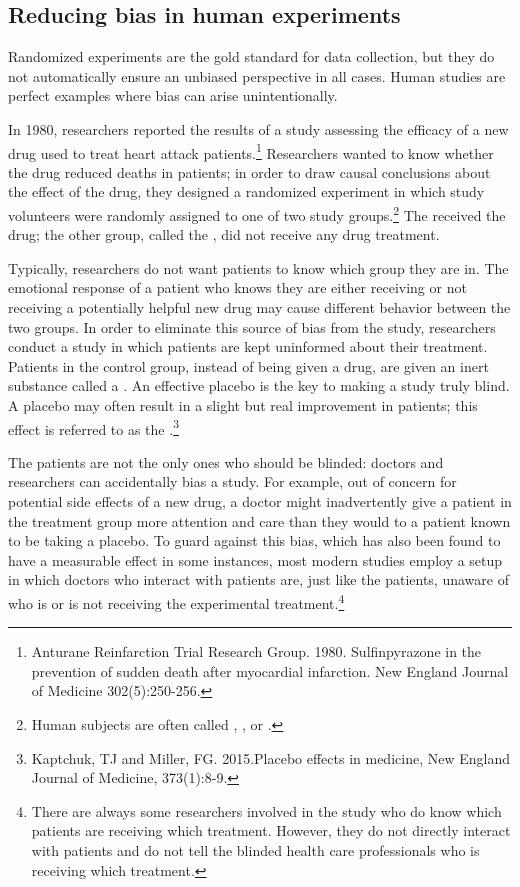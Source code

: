 \begin{doublespace}

\subsection{Reducing bias in human experiments}
\label{biasInHumanExperiments}

Randomized experiments are the gold standard for data collection, but they do not automatically ensure an unbiased perspective in all cases. Human studies are perfect examples where bias can arise unintentionally. 

In 1980, researchers reported the results of a study assessing the efficacy of a new drug used to treat heart attack patients.\footnote{Anturane Reinfarction Trial Research Group. 1980. Sulfinpyrazone in the prevention of sudden death after myocardial infarction. New England Journal of Medicine 302(5):250-256.} Researchers wanted to know whether the drug reduced deaths in patients; in order to draw causal conclusions about the effect of the drug, they designed a randomized experiment in which study volunteers were randomly assigned to one of two study groups.\footnote{Human subjects are often called , , or .} The  received the drug; the other group, called the , did not receive any drug treatment.

Typically, researchers do not want patients to know which group they are in. The emotional response of a patient who knows they are either receiving or not receiving a potentially helpful new drug may cause different behavior between the two groups. In order to eliminate this source of bias from the study, researchers conduct a  study in which patients are kept uninformed about their treatment. Patients in the control group, instead of being given a drug, are given an inert substance called a . An effective placebo is the key to making a study truly blind. A placebo may often result in a slight but real improvement in patients; this effect is referred to as the .\footnote{Kaptchuk, TJ and Miller, FG. 2015.Placebo effects in medicine, New England Journal of Medicine, 373(1):8-9.}

The patients are not the only ones who should be blinded: doctors and researchers can accidentally bias a study. For example, out of concern for potential side effects of a new drug, a doctor might inadvertently give a patient in the treatment group more attention and care than they would to a patient known to be taking a placebo. To guard against this bias, which has also been found to have a measurable effect in some instances, most modern studies employ a  setup in which doctors who interact with patients are, just like the patients, unaware of who is or is not receiving the experimental treatment.\footnote{There are always some researchers involved in the study who do know which patients are receiving which treatment. However, they do not directly interact with patients and do not tell the blinded health care professionals who is receiving which treatment.}


\end{doublespace}
